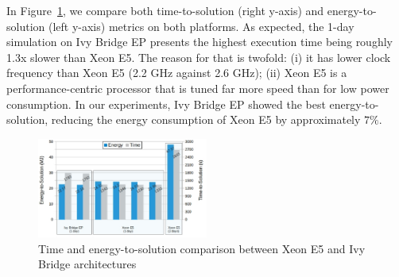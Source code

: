 In Figure~\ref{fig:3}, we compare both time-to-solution (right y-axis)
and  energy-to-solution (left  y-axis) metrics  on both  platforms. As
expected, the 1-day  simulation on Ivy Bridge EP  presents the highest
execution time being roughly 1.3x  slower than Xeon E5. The reason for
that is  twofold: (i) it has  lower clock frequency than  Xeon E5 (2.2
GHz against 2.6 GHz); (ii)  Xeon E5 is a performance-centric processor
that is  tuned far more speed  than for low power  consumption. In our
experiments,  Ivy  Bridge   EP  showed  the  best  energy-to-solution,
reducing the energy consumption of Xeon E5 by approximately $7\%$.

\begin{figure}[htbf]
  \includegraphics[width=0.5\textwidth]{Figs/Time_E2S_COSMO-ART.eps}
  \caption{Time and energy-to-solution comparison between Xeon E5 and
    Ivy Bridge architectures}
  \label{fig:3}
\end{figure}
